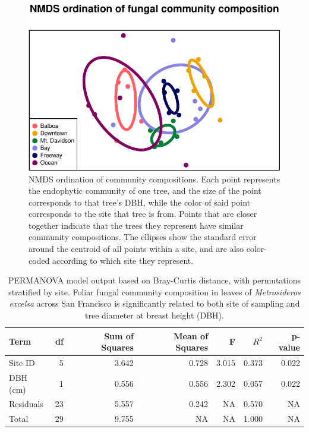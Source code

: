 \documentclass[fleqn,10pt,lineno]{wlpeerj} %
\begin{document}
\begin{figure}
\centering
\includegraphics{gibson2023_files/figure-latex/nmds-plot-1.pdf}
\caption{\label{fig:nmds-plot}NMDS ordination of community compositions. Each point represents the endophytic community of one tree, and the size of the point corresponds to that tree's DBH, while the color of said point corresponds to the site that tree is from. Points that are closer together indicate that the trees they represent have similar community compositions. The ellipses show the standard error around the centroid of all points within a site, and are also color-coded according to which site they represent.}
\end{figure}

\begin{table}[!h]

\caption{\label{tab:permanova-table}PERMANOVA model output based on Bray-Curtis distance, with permutations stratified by site. Foliar fungal community composition in leaves of \emph{Metrosideros excelsa} across San Francisco is significantly related to both site of sampling and tree diameter at breast height (DBH).}
\centering
\begin{tabular}[t]{lrrrrrr}
\toprule
Term & df & Sum of Squares & Mean of Squares & F & $R^{2}$ & p-value\\
\midrule
Site ID & 5 & 3.642 & 0.728 & 3.015 & 0.373 & 0.022\\
DBH (cm) & 1 & 0.556 & 0.556 & 2.302 & 0.057 & 0.022\\
Residuals & 23 & 5.557 & 0.242 & NA & 0.570 & NA\\
Total & 29 & 9.755 & NA & NA & 1.000 & NA\\
\bottomrule
\end{tabular}
\end{table}
\end{document}
